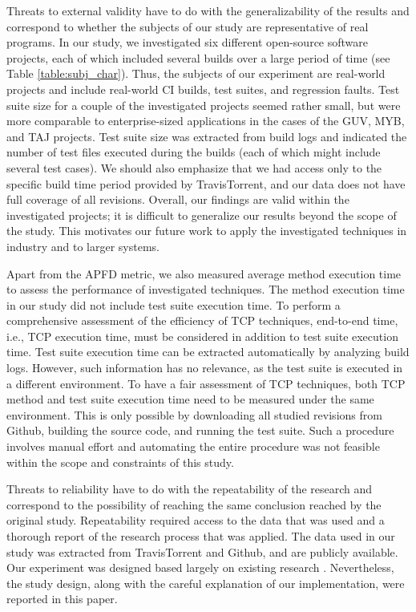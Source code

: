 \documentclass[1p]{elsarticle}
\begin{document}
Threats to external validity have to do with the generalizability of the results and correspond to whether the subjects of our study are representative of real programs. In our study, we investigated six different open-source software projects, each of which included several builds over a large period of time (see Table \ref{table:subj_char}). Thus, the subjects of our experiment are real-world projects and include real-world CI builds, test suites, and regression faults. Test suite size for a couple of the investigated projects seemed rather small, but were more comparable to enterprise-sized applications in the cases of the GUV, MYB, and TAJ projects. Test suite size was extracted from build logs and indicated the number of test files executed during the builds (each of which might include several test cases). We should also emphasize that we had access only to the specific build time period provided by TravisTorrent, and our data does not have full coverage of all revisions. Overall, our findings are valid within the investigated projects; it is difficult to generalize our results beyond the scope of the study. This motivates our future work to apply the investigated techniques in industry and to larger systems.

Apart from the APFD metric, we also measured average method execution time to assess the performance of investigated techniques. The method execution time in our study did not include test suite execution time. To perform a comprehensive assessment of the efficiency of TCP techniques, end-to-end time, i.e., TCP execution time, must be considered in addition to test suite execution time. Test suite execution time can be extracted automatically by analyzing build logs. However, such information has no relevance, as the test suite is executed in a different environment. To have a fair assessment of TCP techniques, both TCP method and test suite execution time need to be measured under the same environment. This is only possible by downloading all studied revisions from Github, building the source code, and running the test suite. Such a procedure involves manual effort and automating the entire procedure was not feasible within the scope and constraints of this study.

Threats to reliability have to do with the repeatability of the research and correspond to the possibility of reaching the same conclusion reached by the original study. Repeatability required access to the data that was used and a thorough report of the research process that was applied. The data used in our study was extracted from TravisTorrent and Github, and are publicly available. Our experiment was designed based largely on existing research \cite{ledru2012prioritizing,hemmati2017prioritizing,feldt2016test}. Nevertheless, the study design, along with the careful explanation of our implementation, were reported in this paper.
\end{document}
